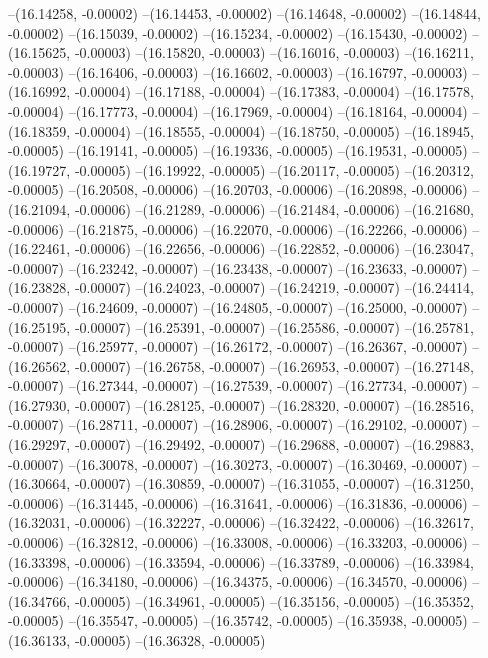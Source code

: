 --(16.14258, -0.00002)
--(16.14453, -0.00002)
--(16.14648, -0.00002)
--(16.14844, -0.00002)
--(16.15039, -0.00002)
--(16.15234, -0.00002)
--(16.15430, -0.00002)
--(16.15625, -0.00003)
--(16.15820, -0.00003)
--(16.16016, -0.00003)
--(16.16211, -0.00003)
--(16.16406, -0.00003)
--(16.16602, -0.00003)
--(16.16797, -0.00003)
--(16.16992, -0.00004)
--(16.17188, -0.00004)
--(16.17383, -0.00004)
--(16.17578, -0.00004)
--(16.17773, -0.00004)
--(16.17969, -0.00004)
--(16.18164, -0.00004)
--(16.18359, -0.00004)
--(16.18555, -0.00004)
--(16.18750, -0.00005)
--(16.18945, -0.00005)
--(16.19141, -0.00005)
--(16.19336, -0.00005)
--(16.19531, -0.00005)
--(16.19727, -0.00005)
--(16.19922, -0.00005)
--(16.20117, -0.00005)
--(16.20312, -0.00005)
--(16.20508, -0.00006)
--(16.20703, -0.00006)
--(16.20898, -0.00006)
--(16.21094, -0.00006)
--(16.21289, -0.00006)
--(16.21484, -0.00006)
--(16.21680, -0.00006)
--(16.21875, -0.00006)
--(16.22070, -0.00006)
--(16.22266, -0.00006)
--(16.22461, -0.00006)
--(16.22656, -0.00006)
--(16.22852, -0.00006)
--(16.23047, -0.00007)
--(16.23242, -0.00007)
--(16.23438, -0.00007)
--(16.23633, -0.00007)
--(16.23828, -0.00007)
--(16.24023, -0.00007)
--(16.24219, -0.00007)
--(16.24414, -0.00007)
--(16.24609, -0.00007)
--(16.24805, -0.00007)
--(16.25000, -0.00007)
--(16.25195, -0.00007)
--(16.25391, -0.00007)
--(16.25586, -0.00007)
--(16.25781, -0.00007)
--(16.25977, -0.00007)
--(16.26172, -0.00007)
--(16.26367, -0.00007)
--(16.26562, -0.00007)
--(16.26758, -0.00007)
--(16.26953, -0.00007)
--(16.27148, -0.00007)
--(16.27344, -0.00007)
--(16.27539, -0.00007)
--(16.27734, -0.00007)
--(16.27930, -0.00007)
--(16.28125, -0.00007)
--(16.28320, -0.00007)
--(16.28516, -0.00007)
--(16.28711, -0.00007)
--(16.28906, -0.00007)
--(16.29102, -0.00007)
--(16.29297, -0.00007)
--(16.29492, -0.00007)
--(16.29688, -0.00007)
--(16.29883, -0.00007)
--(16.30078, -0.00007)
--(16.30273, -0.00007)
--(16.30469, -0.00007)
--(16.30664, -0.00007)
--(16.30859, -0.00007)
--(16.31055, -0.00007)
--(16.31250, -0.00006)
--(16.31445, -0.00006)
--(16.31641, -0.00006)
--(16.31836, -0.00006)
--(16.32031, -0.00006)
--(16.32227, -0.00006)
--(16.32422, -0.00006)
--(16.32617, -0.00006)
--(16.32812, -0.00006)
--(16.33008, -0.00006)
--(16.33203, -0.00006)
--(16.33398, -0.00006)
--(16.33594, -0.00006)
--(16.33789, -0.00006)
--(16.33984, -0.00006)
--(16.34180, -0.00006)
--(16.34375, -0.00006)
--(16.34570, -0.00006)
--(16.34766, -0.00005)
--(16.34961, -0.00005)
--(16.35156, -0.00005)
--(16.35352, -0.00005)
--(16.35547, -0.00005)
--(16.35742, -0.00005)
--(16.35938, -0.00005)
--(16.36133, -0.00005)
--(16.36328, -0.00005)
